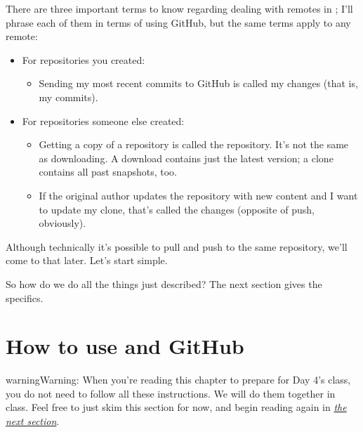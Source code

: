 \documentclass[letterpaper,10pt,english]{jupyterBook}
\begin{document}
\sphinxAtStartPar
There are three important terms to know regarding dealing with remotes in ; I’ll phrase each of them in terms of using GitHub, but the same terms apply to any remote:
\begin{itemize}
\item {} 
\sphinxAtStartPar
For repositories you created:
\begin{itemize}
\item {} 
\sphinxAtStartPar
Sending my most recent commits to GitHub is called  my changes (that is, my commits).

\end{itemize}

\item {} 
\sphinxAtStartPar
For repositories someone else created:
\begin{itemize}
\item {} 
\sphinxAtStartPar
Getting a copy of a repository is called  the repository.  It’s not the same as downloading.  A download contains just the latest version; a clone contains all past snapshots, too.

\item {} 
\sphinxAtStartPar
If the original author updates the repository with new content and I want to update my clone, that’s called  the changes (opposite of push, obviously).

\end{itemize}

\end{itemize}

\sphinxAtStartPar
Although technically it’s possible to pull and push to the same repository, we’ll come to that later.  Let’s start simple.

\sphinxAtStartPar
So how do we do all the things just described?  The next section gives the specifics.


\section{How to use  and GitHub}
\label{\detokenize{chapter-8-version-control:how-to-use-git-and-github}}
\begin{sphinxadmonition}{warning}{Warning:}
\sphinxAtStartPar
When you’re reading this chapter to prepare for Day 4’s class, you do not need to follow all these instructions.  We will do them together in class.  Feel free to just skim this section for now, and begin reading again in {\hyperref[\detokenize{chapter-8-version-control:what-if-i-want-to-collaborate}]{\emph{the next section}}}.
\end{sphinxadmonition}
\end{document}

